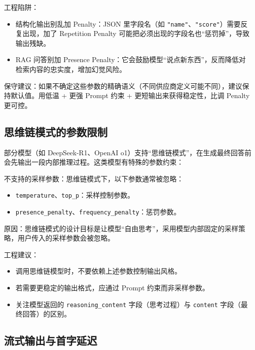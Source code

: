 \documentclass[10pt,a4paper]{ctexart}
\begin{document}
工程陷阱：


\begin{itemize}[itemsep=2pt, topsep=4pt]
  \item 结构化输出别乱加 Penalty：JSON 里字段名（如 \texttt{"name"}、\texttt{"score"}）需要反复出现，加了 Repetition Penalty 可能把必须出现的字段名也“惩罚掉”，导致输出残缺。
  \item RAG 问答别加 Presence Penalty：它会鼓励模型“说点新东西”，反而降低对检索内容的忠实度，增加幻觉风险。
\end{itemize}


保守建议：如果不确定这些参数的精确语义（不同供应商定义可能不同），建议保持默认值。用低温 + 更强 Prompt 约束 + 更短输出来获得稳定性，比调 Penalty 更可控。



\subsection{思维链模式的参数限制}


部分模型（如 DeepSeek-R1、OpenAI o1）支持“思维链模式”，在生成最终回答前会先输出一段内部推理过程。这类模型有特殊的参数约束：



不支持的采样参数：思维链模式下，以下参数通常被忽略：


\begin{itemize}[itemsep=2pt, topsep=4pt]
  \item \texttt{temperature}、\texttt{top\_p}：采样控制参数。
  \item \texttt{presence\_penalty}、\texttt{frequency\_penalty}：惩罚参数。
\end{itemize}


原因：思维链模式的设计目标是让模型“自由思考”，采用模型内部固定的采样策略，用户传入的采样参数会被忽略。



工程建议：


\begin{itemize}[itemsep=2pt, topsep=4pt]
  \item 调用思维链模型时，不要依赖上述参数控制输出风格。
  \item 若需要更稳定的输出格式，应通过 Prompt 约束而非采样参数。
  \item 关注模型返回的 \texttt{reasoning\_content} 字段（思考过程）与 \texttt{content} 字段（最终回答）的区别。
\end{itemize}


\subsection{流式输出与首字延迟}
\end{document}
